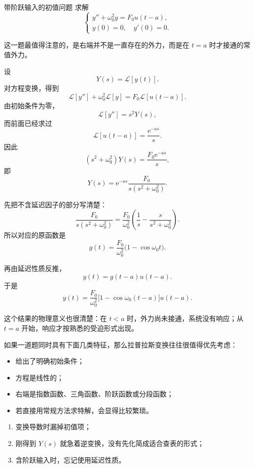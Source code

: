 \begin{lizi}{带阶跃输入的初值问题}{}
求解
\[
    \begin{cases}
        y''+\omega_0^2 y=F_0u(t-a),\\
        y(0)=0,\quad y'(0)=0.
    \end{cases}
\]

\begin{jie}
这一题最值得注意的，是右端并不是一直存在的外力，而是在 $t=a$ 时才接通的常值外力。

设
\[
    Y(s)=\mathcal{L}[y(t)].
\]
对方程变换，得到
\[
    \mathcal{L}[y'']+\omega_0^2\mathcal{L}[y]
    =
    F_0\mathcal{L}[u(t-a)].
\]
由初始条件为零，
\[
    \mathcal{L}[y'']=s^2Y(s),
\]
而前面已经求过
\[
    \mathcal{L}[u(t-a)]
    =
    \frac{\mathrm{e}^{-as}}{s}.
\]
因此
\[
    (s^2+\omega_0^2)Y(s)
    =
    \frac{F_0\mathrm{e}^{-as}}{s},
\]
即
\[
    Y(s)
    =
    \mathrm{e}^{-as}\frac{F_0}{s(s^2+\omega_0^2)}.
\]

先把不含延迟因子的部分写清楚：
\[
    \frac{F_0}{s(s^2+\omega_0^2)}
    =
    \frac{F_0}{\omega_0^2}
    \left(
        \frac{1}{s}
        -
        \frac{s}{s^2+\omega_0^2}
    \right).
\]
所以对应的原函数是
\[
    g(t)
    =
    \frac{F_0}{\omega_0^2}\bigl(1-\cos \omega_0 t\bigr).
\]

再由延迟性质反推，
\[
    y(t)=g(t-a)u(t-a).
\]
于是
\[
    y(t)
    =
    \frac{F_0}{\omega_0^2}
    \bigl[1-\cos \omega_0(t-a)\bigr]u(t-a).
\]

这个结果的物理意义也很清楚：在 $t<a$ 时，外力尚未接通，系统没有响应；从 $t=a$ 开始，响应才按熟悉的受迫形式出现。
\end{jie}
\end{lizi}

\begin{tishi}[什么时候应优先想到拉普拉斯变换]
如果一道题同时具有下面几类特征，那么拉普拉斯变换往往很值得优先考虑：
\begin{itemize}
    \item 给出了明确初始条件；
    \item 方程是线性的；
    \item 右端是指数函数、三角函数、阶跃函数或分段函数；
    \item 若直接用常规方法求特解，会显得比较繁琐。
\end{itemize}
\end{tishi}

\begin{jinshi}[这一节最容易错的地方]
\begin{enumerate}
    \item 变换导数时漏掉初值项；
    \item 刚得到 $Y(s)$ 就急着逆变换，没有先化简成适合查表的形式；
    \item 含阶跃输入时，忘记使用延迟性质。
\end{enumerate}
\end{jinshi}

